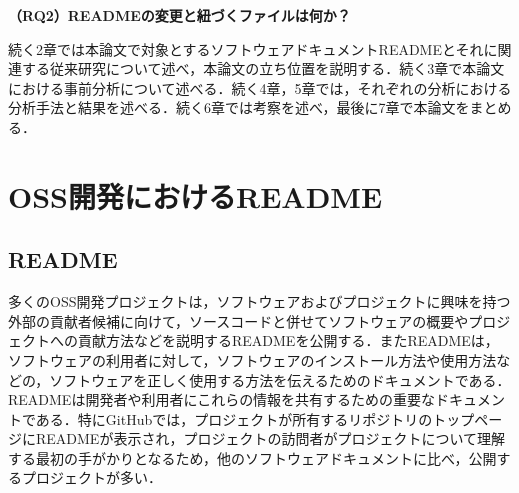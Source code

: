 \documentclass[submit]{ipsj}
\begin{document}
\noindent\textbf{（RQ2）READMEの変更と紐づくファイルは何か？}





\noindent\textbf{}

続く2章では本論文で対象とするソフトウェアドキュメントREADMEとそれに関連する従来研究について述べ，本論文の立ち位置を説明する．続く3章で本論文における事前分析について述べる．続く4章，5章では，それぞれの分析における分析手法と結果を述べる．続く6章では考察を述べ，最後に7章で本論文をまとめる．


		
\section{OSS開発におけるREADME}
\subsection{README}

多くのOSS開発プロジェクトは，ソフトウェアおよびプロジェクトに興味を持つ外部の貢献者候補に向けて，ソースコードと併せてソフトウェアの概要やプロジェクトへの貢献方法などを説明するREADMEを公開する．またREADMEは，ソフトウェアの利用者に対して，ソフトウェアのインストール方法や使用方法などの，ソフトウェアを正しく使用する方法を伝えるためのドキュメントである．READMEは開発者や利用者にこれらの情報を共有するための重要なドキュメントである．特にGitHubでは，プロジェクトが所有するリポジトリのトップページにREADMEが表示され，プロジェクトの訪問者がプロジェクトについて理解する最初の手がかりとなるため，他のソフトウェアドキュメントに比べ，公開するプロジェクトが多い\cite{Ikeda_2}．
\end{document}
